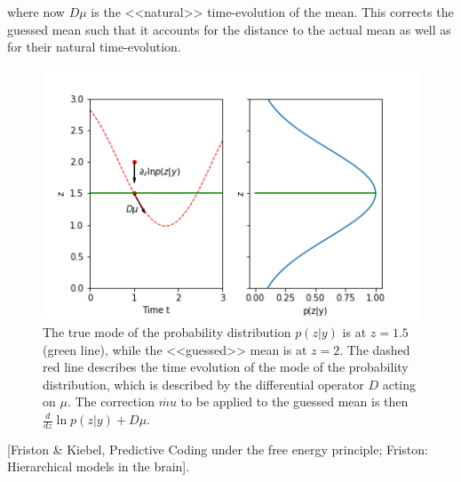 where now $D\mu$ is the <<natural>> time-evolution of the mean. This corrects the guessed mean such that it accounts for the distance to the actual mean as well as for their natural time-evolution.
\begin{center}
\begin{figure}
\includegraphics[scale=0.7]{images/FE_ex_4}
\caption{The true mode of the probability distribution $p(z|y)$ is at $z=1.5$ (green line), while the <<guessed>> mean is at $z=2$. The dashed red line describes the time evolution of the mode of the probability distribution, which is described by the differential operator $D$ acting on $\mu$. The correction $\dot{mu}$ to be applied to the guessed mean is then $\frac{d}{dz} \ln p(z|y) + D\mu$.}
\end{figure}
\end{center}
[Friston \& Kiebel, Predictive Coding under the free energy principle; Friston: Hierarchical models in the brain].